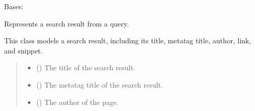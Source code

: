 \documentclass[letterpaper,10pt,english]{sphinxmanual}
\begin{document}
\begin{fulllineitems}
\label{\detokenize{src.data_models:src.data_models.company.SearchResult}}
\pysigstartsignatures
\pysiglinewithargsret
{}
{\sphinxparamcomma {}\sphinxparamcomma {}\sphinxparamcomma {}\sphinxparamcomma {}\sphinxparamcomma {}}
{}
\pysigstopsignatures
\sphinxAtStartPar
Bases: 

\sphinxAtStartPar
Represents a search result from a query.

\sphinxAtStartPar
This class models a search result, including its title, metatag title, author, link, and snippet.
\begin{quote}\begin{description}
\begin{itemize}
\item {} 
\sphinxAtStartPar
{} () \textendash{} The title of the search result.

\item {} 
\sphinxAtStartPar
{} (\sphinxstyleliteralemphasis{\sphinxupquote{{[}}}\sphinxstyleliteralemphasis{\sphinxupquote{{]}}}) \textendash{} The metatag title of the search result.

\item {} 
\sphinxAtStartPar
{} (\sphinxstyleliteralemphasis{\sphinxupquote{{[}}}\sphinxstyleliteralemphasis{\sphinxupquote{{]}}}) \textendash{} The author of the page.


\end{itemize}
\end{description}
\end{quote}
\end{fulllineitems}
\end{document}
